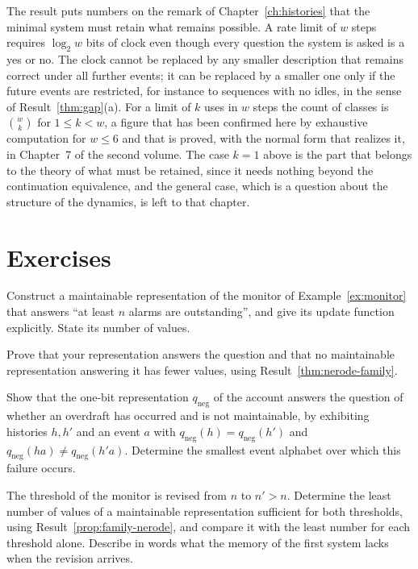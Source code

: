 The result puts numbers on the remark of Chapter~\ref{ch:histories} that the minimal system must retain what remains possible. A rate limit of $w$ steps requires $\log_2 w$ bits of clock even though every question the system is asked is a yes or no. The clock cannot be replaced by any smaller description that remains correct under all further events; it can be replaced by a smaller one only if the future events are restricted, for instance to sequences with no idles, in the sense of Result~\ref{thm:gap}(a). For a limit of $k$ uses in $w$ steps the count of classes is $\binom{w}{k}$ for $1\le k<w$, a figure that has been confirmed here by exhaustive computation for $w\le6$ and that is proved, with the normal form that realizes it, in Chapter~7 of the second volume. The case $k=1$ above is the part that belongs to the theory of what must be retained, since it needs nothing beyond the continuation equivalence, and the general case, which is a question about the structure of the dynamics, is left to that chapter.

\section*{Exercises}

\begin{exercise}
Construct a maintainable representation of the monitor of Example~\ref{ex:monitor} that answers ``at least $n$ alarms are outstanding'', and give its update function explicitly. State its number of values.
\end{exercise}

\begin{exercise}
Prove that your representation answers the question and that no maintainable representation answering it has fewer values, using Result~\ref{thm:nerode-family}.
\end{exercise}

\begin{exercise}
Show that the one-bit representation $q_{\mathrm{neg}}$ of the account answers the question of whether an overdraft has occurred and is not maintainable, by exhibiting histories $h,h'$ and an event $a$ with $q_{\mathrm{neg}}(h)=q_{\mathrm{neg}}(h')$ and $q_{\mathrm{neg}}(ha)\ne q_{\mathrm{neg}}(h'a)$. Determine the smallest event alphabet over which this failure occurs.
\end{exercise}

\begin{exercise}
The threshold of the monitor is revised from $n$ to $n'>n$. Determine the least number of values of a maintainable representation sufficient for both thresholds, using Result~\ref{prop:family-nerode}, and compare it with the least number for each threshold alone. Describe in words what the memory of the first system lacks when the revision arrives.
\end{exercise}

